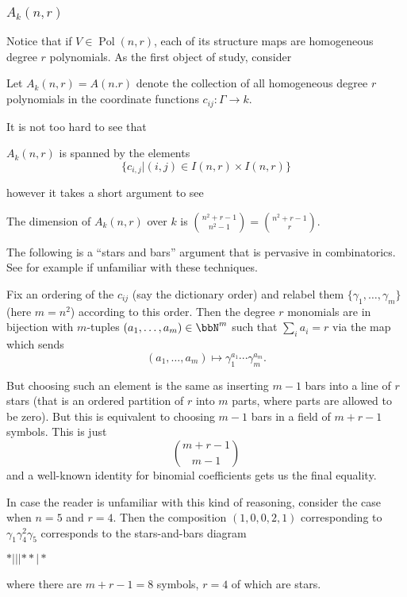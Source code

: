 \documentclass[12pt]{article}
\DeclareMathOperator{\Pol}{Pol}
\begin{document}
\subsubsection{\texorpdfstring{$A_k(n,r)$}{Ak(n,r)}}
Notice that if $V\in \Pol(n,r)$, each of its structure maps are homogeneous degree $r$ polynomials. As the first object of study, consider 
\begin{defn}
	Let $A_k(n,r)=A(n.r)$ denote the collection of all homogeneous degree $r$ polynomials in the 
	coordinate functions $c_{ij}:\Gamma\to k$.
\end{defn}
It is not too hard to see that 
\begin{prop}
	$A_k(n,r)$ is spanned by the elements 
	\[\{c_{i,j}|(i,j)\in I(n,r)\times I(n,r)\}\]
\end{prop}
however it takes a short argument to see 
\begin{lem}
	The dimension of $A_k(n,r)$ over $k$ is $\binom{n^2+r-1}{n^2-1}=\binom{n^2+r-1}{r}$.
\end{lem}
\begin{prf}
	The following is a ``stars and bars'' argument that is pervasive in combinatorics. See for example \cite{stanley} if unfamiliar with these techniques.
	
	Fix an ordering of the $c_{ij}$ (say the dictionary order)
	and relabel them $\{\gamma_1,\dots,\gamma_{m}\}$ (here $m=n^2$) according to this order. Then the degree $r$ monomials are in bijection with $m$-tuples $(a_1,\dots,a_{m})\in\bbN^m$ such that $\sum_i a_i=r$ via the map which sends 
	\[(a_1,\dots,a_{m})\mapsto \gamma_1^{a_1}\cdots\gamma_{m}^{a_{m}}.\]

	But choosing such an element is the same as inserting $m-1$ bars into a line of $r$ stars (that is an ordered partition of $r$ into $m$ parts, 
	where parts are allowed to be zero). But this is equivalent to choosing $m-1$ bars in a field of $m+r-1$ symbols. This is just 
	\[\binom{m+r-1}{m-1}\]
	and a well-known identity for binomial coefficients gets us the final equality.
\end{prf}
\begin{ex}
	In case the reader is unfamiliar with this kind of reasoning, consider the case when $n=5$ and $r=4$. Then the composition $(1,0,0,2,1)$ corresponding to 
	$\gamma_1\gamma_4^2\gamma_5$ corresponds to the stars-and-bars diagram 
	\begin{center}
		$\ast|||\ast\ast|\ast$
	\end{center}
	where there are $m+r-1=8$ symbols, $r=4$ of which are stars.
\end{ex}
\end{document}

